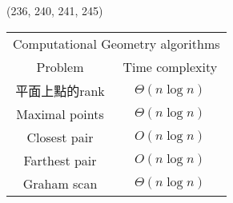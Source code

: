 \item \begin{theorem}{(236, 240, 241, 245)} \quad\quad
    \begin{table}[H]
        \centering
        \begin{tabular}{|c|c|}
            \hline
            \multicolumn{2}{|c|}{Computational Geometry algorithms} \\
            \Xhline{3\arrayrulewidth}
            Problem & Time complexity \\
            \Xhline{2\arrayrulewidth}
            平面上點的rank & $\Theta(n\log n)$ \\
            \hline
            Maximal points & $\Theta(n\log n)$ \\
            \hline
            Closest pair & $O(n\log n)$ \\
            \hline
            Farthest pair & $O(n\log n)$ \\
            \hline
            Graham scan & $\Theta(n\log n)$ \\
            \hline
        \end{tabular}
    \end{table}
\end{theorem}